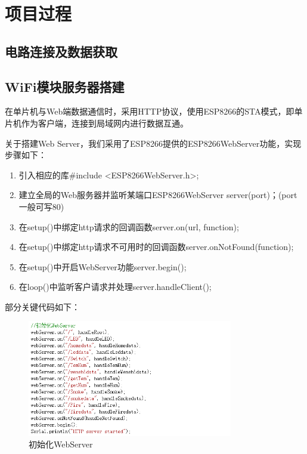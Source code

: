 
\chapter{项目过程}

\section{电路连接及数据获取}

\section{WiFi模块服务器搭建}

在单片机与Web端数据通信时，采用HTTP协议，使用ESP8266的STA模式，即单片机作为客户端，连接到局域网内进行数据互通。

关于搭建Web Server，我们采用了ESP8266提供的ESP8266WebServer功能，实现步骤如下：

\begin{enumerate}
    \item 引入相应的库\#include  \textless ESP8266WebServer.h\textgreater;
    \item 建立全局的Web服务器并监听某端口ESP8266WebServer server(port)；(port一般可写80) 
    \item 在setup()中绑定http请求的回调函数server.on(url, function);
    \item 在setup()中绑定http请求不可用时的回调函数server.onNotFound(function);
    \item 在setup()中开启WebServer功能server.begin();
    \item 在loop()中监听客户请求并处理server.handleClient();
\end{enumerate}

部分关键代码如下：

\begin{figure}[htbp]
    \centering
    \includegraphics[width=0.8\textwidth]{figures/code/1}
    \caption{初始化WebServer}
\end{figure}

